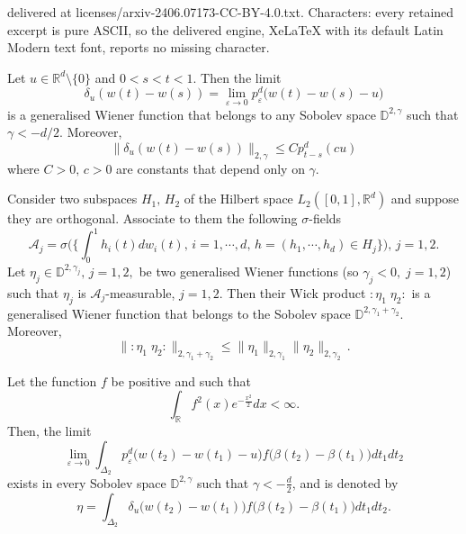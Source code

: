 \documentclass[10pt,a4paper]{amsart}
\newcommand{\D}{{\mathbb{D}}}
\newcommand{\R}{{\mathbb{R}}}
\begin{document}
delivered at licenses/arxiv-2406.07173-CC-BY-4.0.txt. Characters: every retained excerpt is pure ASCII, so the delivered engine, XeLaTeX with its default Latin Modern text font, reports no missing character.
\begin{prop}\label{prop1}
Let $u\in \R^d\setminus\{0\}$ and $0<s<t<1$. Then the limit 
$$ \delta_u(w(t)-w(s))=\lim_{\varepsilon \to 0}  p^d_{\varepsilon}\big( w(t )-w(s)-u) $$
is a generalised Wiener function that belongs to any Sobolev space $\D^{2,\gamma}$ such that $\gamma < -d/2$. Moreover,
$$ \big \| \delta_u(w(t)-w(s)) \big\| _{2,\gamma} \leqslant C p^d_{t-s}(cu) $$
where $C>0,\, c>0$ are constants that depend only on $\gamma$.
\end{prop}

\begin{prop}\label{prop2} Consider two subspaces $H_1, \, H_2$ of the Hilbert space $L_2([0,1],\R^d)$ and suppose they are orthogonal. Associate to them the following $\sigma$-fields 
$$  \mathcal{A}_j=\sigma \Big( \Big\{ \int_0^1h_i(t)dw_i(t),\, i=1,\cdots,d, \, h=(h_1,\cdots, h_d)\in H_j \Big\}\Big), \, j=1,2. $$
Let $\eta _j \in \D^{2,\gamma_j},\, j=1,2,$ be two generalised Wiener functions (so $\gamma _j <0,\; j=1,2$) such that $\eta_j$ is $\mathcal{A}_j$-measurable, $j=1,2$. Then their Wick product $ :\eta_1\;\eta_2: $ is a generalised Wiener function that belongs to the Sobolev space $\D^{2,\gamma_1+\gamma_2}$. Moreover,
$$ \big \| :\eta_1\;\eta_2: \big\| _{2,\gamma_1+\gamma_2} \leqslant   \big \| \eta_1  \big\| _{2,\gamma_1 }  \big \| \eta_2 \big\| _{2,\gamma_2}\,. $$

\end{prop}

\begin{thm} \label{thm77}
Let the function $f$ be positive and such that 
$$ \int_{\R} f^2(x)e^{-\frac{x^2}{2}}dx <\infty. $$
Then, the limit
$$ 
\lim_{\varepsilon \to 0} \int_{\Delta_2  }  p^d_{\varepsilon}\big( w(t_2)-w(t_1)-u\big)f\big( \beta(t_2)-\beta(t_1)\big )    dt_1dt_2 $$
exists in every Sobolev space $\mathbb{D}^{2,\gamma}$ such that $\gamma <-\frac{d}{2} $, and is denoted by 
$$ \eta=\int _{\Delta_2} \delta_u \big(w(t_2)-w(t_1) \big) f\big( \beta(t_2)-\beta(t_1)\big ) dt_1dt_2 .$$
\end{thm}
\end{document}
